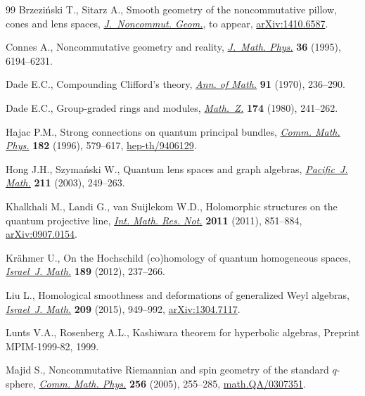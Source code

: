 \documentclass[pdftex]{sigma}
\numberwithin{equation}{section}
\begin{document}
\begin{thebibliography}{99}
Brzezi{\'n}ski T., Sitarz A., Smooth geometry of the noncommutative pillow,
 cones and lens spaces, \href{http://dx.doi.org/10.4171/JNCG/56}{\textit{J.~Noncommut. Geom.}}, {t}o appear,
 \href{http://arxiv.org/abs/1410.6587}{arXiv:1410.6587}.

Connes A., Noncommutative geometry and reality, \href{http://dx.doi.org/10.1063/1.531241}{\textit{J.~Math. Phys.}}
 \textbf{36} (1995), 6194--6231.

Dade E.C., Compounding {C}lif\/ford's theory, \href{http://dx.doi.org/10.2307/1970606}{\textit{Ann. of Math.}} \textbf{91}
 (1970), 236--290.

Dade E.C., Group-graded rings and modules, \href{http://dx.doi.org/10.1007/BF01161413}{\textit{Math.~Z.}} \textbf{174}
 (1980), 241--262.

Hajac P.M., Strong connections on quantum principal bundles, \href{http://dx.doi.org/10.1007/BF02506418}{\textit{Comm.
 Math. Phys.}} \textbf{182} (1996), 579--617, \href{http://arxiv.org/abs/hep-th/9406129}{hep-th/9406129}.

Hong J.H., Szyma{\'n}ski W., Quantum lens spaces and graph algebras,
 \href{http://dx.doi.org/10.2140/pjm.2003.211.249}{\textit{Pacific~J. Math.}} \textbf{211} (2003), 249--263.

Khalkhali M., Landi G., van Suijlekom W.D., Holomorphic structures on the
 quantum projective line, \href{http://dx.doi.org/10.1093/imrn/rnq097}{\textit{Int. Math. Res. Not.}} \textbf{2011} (2011),
 851--884, \href{http://arxiv.org/abs/0907.0154}{arXiv:0907.0154}.

Kr{\"a}hmer U., On the {H}ochschild (co)homology of quantum homogeneous spaces,
 \href{http://dx.doi.org/10.1007/s11856-011-0168-4}{\textit{Israel~J. Math.}} \textbf{189} (2012), 237--266.

Liu L., Homological smoothness and deformations of generalized {W}eyl algebras,
 \href{http://dx.doi.org/10.1007/s11856-015-1242-0}{\textit{Israel~J. Math.}} \textbf{209} (2015), 949--992, \href{http://arxiv.org/abs/1304.7117}{arXiv:1304.7117}.

Lunts V.A., Rosenberg A.L., Kashiwara theorem for hyperbolic algebras,
 {P}reprint MPIM-1999-82, 1999.

Majid S., Noncommutative {R}iemannian and spin geometry of the standard
 {$q$}-sphere, \href{http://dx.doi.org/10.1007/s00220-005-1295-8}{\textit{Comm. Math. Phys.}} \textbf{256} (2005), 255--285,
 \href{http://arxiv.org/abs/math.QA/0307351}{math.QA/0307351}.


\end{thebibliography}
\end{document}
